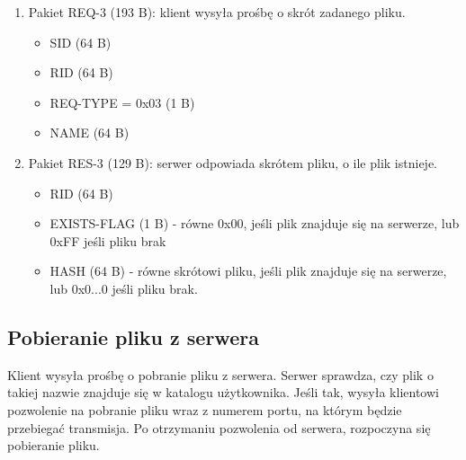 \documentclass{article}
\begin{document}
	\begin{enumerate}
		\item Pakiet REQ-3 \label{REQ-3} (193 B): klient wysyła prośbę o skrót zadanego pliku. 
		\begin{itemize}
			\item SID (64 B)
			\item RID (64 B)
			\item REQ-TYPE = 0x03 (1 B)
			\item NAME (64 B)
		\end{itemize}
		
		\item Pakiet RES-3 \label{RES-3} (129 B): serwer odpowiada skrótem pliku, o ile plik istnieje.  
		\begin{itemize}
			\item RID (64 B)
			\item EXISTS-FLAG (1 B) - równe 0x00, jeśli plik znajduje się na serwerze, lub 0xFF jeśli pliku brak
			\item HASH (64 B) - równe skrótowi pliku, jeśli plik znajduje się na serwerze, lub 0x0...0 jeśli pliku brak. 
		\end{itemize}
		
	\end{enumerate}

	\subsection{Pobieranie pliku z serwera}
	Klient wysyła prośbę o pobranie pliku z serwera. Serwer sprawdza, czy plik o takiej nazwie znajduje się w katalogu użytkownika. Jeśli tak, wysyła klientowi pozwolenie na pobranie pliku wraz z numerem portu, na którym będzie przebiegać transmisja. Po otrzymaniu pozwolenia od serwera, rozpoczyna się pobieranie pliku. 
	
\end{document}
